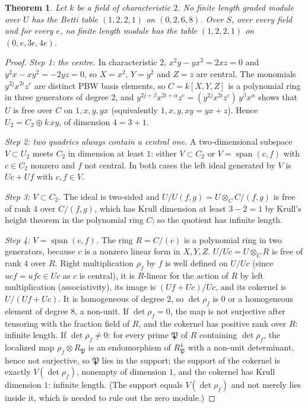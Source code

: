 \documentclass[11pt]{article}
\newtheorem{thmletter}{Theorem}
\theoremstyle{definition}
\theoremstyle{remark}
\begin{document}
\begin{thmletter}\label{thm:B}
Let $k$ be a field of characteristic $2$. No finite length graded module over $U$ has the Betti table $(1,2,2,1)$ on $(0,2,6,8)$. Over $S$, over every field and for every $e$, no finite length module has the table $(1,2,2,1)$ on $(0,e,3e,4e)$.
\end{thmletter}
\begin{proof}
\emph{Step 1: the centre.} In characteristic $2$, $x^2y-yx^2=2xz=0$ and $y^2x-xy^2=-2yz=0$, so $X=x^2$, $Y=y^2$ and $Z=z$ are central. The monomials $y^{2j}x^{2i}z^c$ are distinct PBW basis elements, so $C=k[X,Y,Z]$ is a polynomial ring in three generators of degree $2$, and $y^{2j+\beta}x^{2i+\alpha}z^c=(y^{2j}x^{2i}z^c)\,y^\beta x^\alpha$ shows that $U$ is free over $C$ on $1,x,y,yx$ (equivalently $1,x,y,xy=yx+z$). Hence $U_2=C_2\oplus k\,xy$, of dimension $4=3+1$.

\emph{Step 2: two quadrics always contain a central one.} A two-dimensional subspace $V\subset U_2$ meets $C_2$ in dimension at least $1$: either $V\subset C_2$ or $V=\operatorname{span}(c,f)$ with $c\in C_2$ nonzero and $f$ not central. In both cases the left ideal generated by $V$ is $Uc+Uf$ with $c,f\in V$.

\emph{Step 3: $V\subset C_2$.} The ideal is two-sided and $U/U(f,g)=U\otimes_CC/(f,g)$ is free of rank $4$ over $C/(f,g)$, which has Krull dimension at least $3-2=1$ by Krull's height theorem in the polynomial ring $C$; so the quotient has infinite length.

\emph{Step 4: $V=\operatorname{span}(c,f)$.} The ring $R=C/(c)$ is a polynomial ring in two generators, because $c$ is a nonzero linear form in $X,Y,Z$. $U/Uc=U\otimes_CR$ is free of rank $4$ over $R$. Right multiplication $\rho_f$ by $f$ is well defined on $U/Uc$ (since $ucf=ufc\in Uc$ as $c$ is central), it is $R$-linear for the action of $R$ by left multiplication (associativity), its image is $(Uf+Uc)/Uc$, and its cokernel is $U/(Uf+Uc)$. It is homogeneous of degree $2$, so $\det\rho_f$ is $0$ or a homogeneous element of degree $8$, a non-unit. If $\det\rho_f=0$, the map is not surjective after tensoring with the fraction field of $R$, and the cokernel has positive rank over $R$: infinite length. If $\det\rho_f\ne0$: for every prime $\mathfrak P$ of $R$ containing $\det\rho_f$, the localized map $\rho_f\otimes R_{\mathfrak P}$ is an endomorphism of $R_{\mathfrak P}^4$ with a non-unit determinant, hence not surjective, so $\mathfrak P$ lies in the support; the support of the cokernel is exactly $V(\det\rho_f)$, nonempty of dimension $1$, and the cokernel has Krull dimension $1$: infinite length. (The support equals $V(\det\rho_f)$ and not merely lies inside it, which is needed to rule out the zero module.)


\end{proof}
\end{document}
